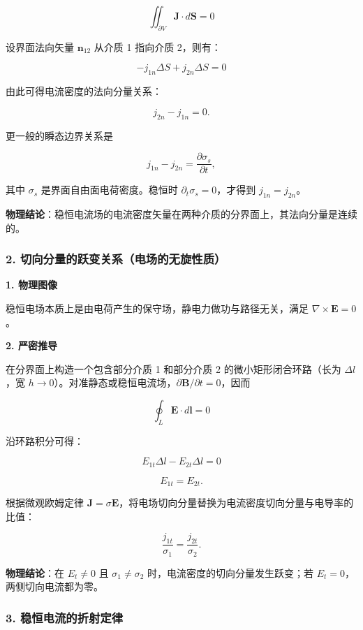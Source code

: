 \[
\iint_{\partial V}\mathbf J\cdot d\mathbf S=0
\]

设界面法向矢量 \(\mathbf n_{12}\) 从介质 1 指向介质 2，则有：

\[
-j_{1n} \Delta S + j_{2n} \Delta S = 0
\]

由此可得电流密度的法向分量关系：

\[
\boxed{j_{2n}-j_{1n}=0}.
\]

更一般的瞬态边界关系是

\[
\boxed{
j_{1n}-j_{2n}=\frac{\partial\sigma_s}{\partial t}
},
\]

其中 \(\sigma_s\) 是界面自由面电荷密度。稳恒时
\(\partial_t\sigma_s=0\)，才得到 \(j_{1n}=j_{2n}\)。

\textbf{物理结论}：稳恒电流场的电流密度矢量在两种介质的分界面上，其法向分量是连续的。

\subsubsection{2.
切向分量的跃变关系（电场的无旋性质）}\label{m4:ux5207ux5411ux5206ux91cfux7684ux8dc3ux53d8ux5173ux7cfbux7535ux573aux7684ux65e0ux65cbux6027ux8d28}

\textbf{1. 物理图像}

稳恒电场本质上是由电荷产生的保守场，静电力做功与路径无关，满足
\(\nabla \times \mathbf{E} = 0\)。

\textbf{2. 严密推导}

在分界面上构造一个包含部分介质 1 和部分介质 2 的微小矩形闭合环路（长为
\(\Delta l\)，宽
\(h\to0\)）。对准静态或稳恒电流场，\(\partial\mathbf B/\partial t=0\)，因而

\[
\oint_L \mathbf{E} \cdot d\mathbf{l} = 0
\]

沿环路积分可得：

\[
E_{1t} \Delta l - E_{2t} \Delta l = 0
\]

\[
\boxed{E_{1t}=E_{2t}}.
\]

根据微观欧姆定律
\(\mathbf{J} = \sigma \mathbf{E}\)，将电场切向分量替换为电流密度切向分量与电导率的比值：

\[
\boxed{
\frac{j_{1t}}{\sigma_1}
=\frac{j_{2t}}{\sigma_2}
}.
\]

\textbf{物理结论}：在 \(E_t\ne0\) 且 \(\sigma_1\ne\sigma_2\)
时，电流密度的切向分量发生跃变；若 \(E_t=0\)，两侧切向电流都为零。

\subsubsection{3.
稳恒电流的折射定律}\label{m4:ux7a33ux6052ux7535ux6d41ux7684ux6298ux5c04ux5b9aux5f8b}

